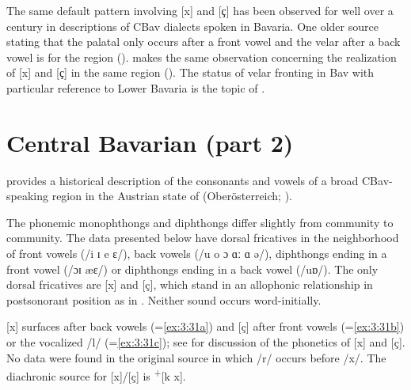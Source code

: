 The same default pattern involving [x] and [{ҫ}] has been observed for well over a century in descriptions of CBav dialects spoken in Bavaria. One older source stating that the palatal only occurs after a front vowel and the velar after a back vowel is \citet[46]{Schwäbl1903} for the  region (). \textcites[178--179]{Kufner1957}[12--13]{Kufner1960} makes the same observation concerning the realization of [x] and [ҫ] in the same region (). The status of velar fronting in Bav with particular reference to Lower Bavaria is the topic of .

\section{{Central} {Bavarian} {(part} {2)}}\label{sec:3.6}

\citet{Haasbauer1924} provides a historical description of the consonants and vowels of a broad CBav-speaking region in the Austrian state of  (Oberösterreich; ).

The phonemic monophthongs and diphthongs differ slightly from community to community. The data presented below have dorsal fricatives in the neighborhood of front vowels (/i ɪ e ɛ/), back vowels (/u o ɔ ɑː ɑ ə/), diphthongs ending in a front vowel (/ɔɪ æɛ/) or diphthongs ending in a back vowel (/uɒ/). The only dorsal fricatives are [x] and [ç], which stand in an allophonic relationship in postsonorant position as in . Neither sound occurs word-initially.

[x] surfaces after back vowels (=\ref{ex:3:31a}) and [ç] after front vowels (=\ref{ex:3:31b}) or the vocalized /l/ (=\ref{ex:3:31c}); see \citet[100]{Haasbauer1924} for discussion of the phonetics of [x] and [ç]. No data were found in the original source in which /r/ occurs before /x/. The diachronic source for [x]/[ç] is  \textsc{\textsuperscript{+}}[k x].

